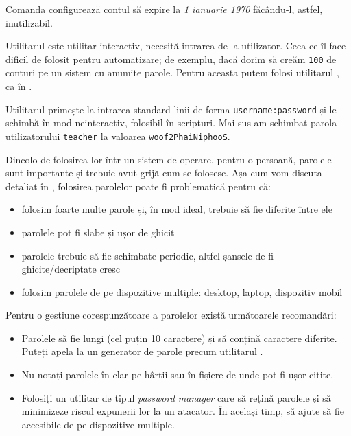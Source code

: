 Comanda configurează contul să expire la \textit{1 ianuarie 1970} făcându-l, astfel, inutilizabil.

Utilitarul  este utilitar interactiv, necesită intrarea de la utilizator.
Ceea ce îl face dificil de folosit pentru automatizare;
de exemplu, dacă dorim să creăm \texttt{100} de conturi pe un sistem cu anumite parole.
Pentru aceasta putem folosi utilitarul , ca în .


Utilitarul  primește la intrarea standard linii de forma \texttt{username:password} și le schimbă în mod neinteractiv, folosibil în scripturi.
Mai sus am schimbat parola utilizatorului \texttt{teacher} la valoarea \texttt{woof2PhaiNiphooS}.

Dincolo de folosirea lor într-un sistem de operare, pentru o persoană, parolele sunt importante și trebuie avut grijă cum se folosesc.
Așa cum vom discuta detaliat în , folosirea parolelor poate fi problematică pentru că:

\begin{itemize}
  \item folosim foarte multe parole și, în mod ideal, trebuie să fie diferite între ele
  \item parolele pot fi slabe și ușor de ghicit
  \item parolele trebuie să fie schimbate periodic, altfel șansele de fi ghicite/decriptate cresc
  \item folosim parolele de pe dispozitive multiple: desktop, laptop, dispozitiv mobil
\end{itemize}

Pentru o gestiune corespunzătoare a parolelor există următoarele recomandări:

\begin{itemize}
  \item Parolele să fie lungi (cel puțin 10 caractere) și să conțină caractere diferite.
    Puteți apela la un generator de parole precum utilitarul .
  \item Nu notați parolele în clar pe hârtii sau în fișiere de unde pot fi ușor citite.
  \item Folosiți un utilitar de tipul \textit{password manager} care să rețină parolele și să minimizeze riscul expunerii lor la un atacator.
    În același timp, să ajute să fie accesibile de pe dispozitive multiple.
\end{itemize}

